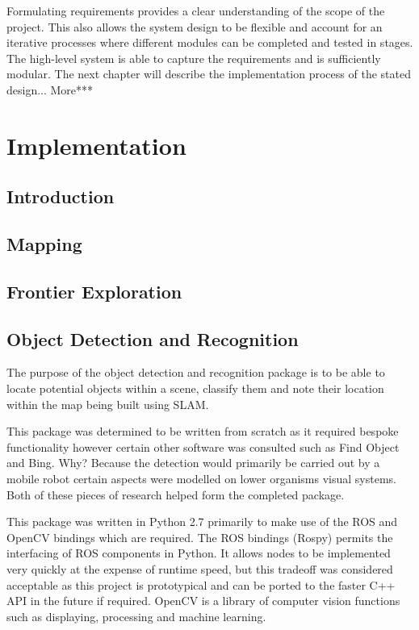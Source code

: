 \documentclass{mproj}
\begin{document}
Formulating requirements provides a clear understanding of the scope of the project. This also allows the system design to be flexible and account for an iterative processes where different modules can be completed and tested in stages. The high-level system is able to capture the requirements and is sufficiently modular. The next chapter will describe the implementation process of the stated design... More***  


\chapter{Implementation}
\section{Introduction}

\section{Mapping}
\section{Frontier Exploration}

\section{Object Detection and Recognition}
The purpose of the object detection and recognition package is to be able to locate potential objects within a scene, classify them and note their location within the map being built using SLAM.

This package was determined to be written from scratch as it required bespoke functionality however certain other software was consulted such as Find Object \cite{} and Bing\cite{}. Why? Because the detection would primarily be carried out by a mobile robot certain aspects were modelled on lower organisms visual systems. Both of these pieces of research helped form the completed package.

This package was written in Python 2.7 primarily to make use of the ROS and OpenCV bindings which are required. The ROS bindings (Rospy) permits the interfacing of ROS components in Python. It allows nodes to be implemented very quickly at the expense of runtime speed, but this tradeoff was considered acceptable as this project is prototypical and can be ported to the faster C++ API in the future if required. OpenCV is a library of computer vision functions such as displaying, processing and machine learning.
\end{document}
